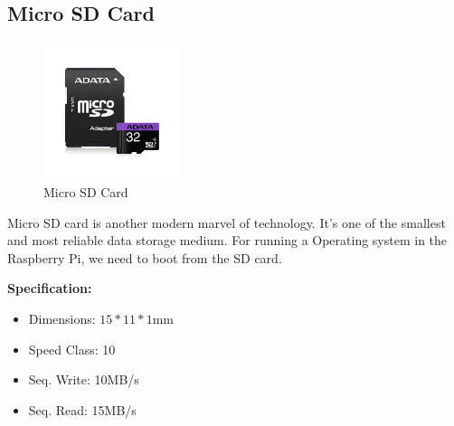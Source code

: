     \subsection{Micro SD Card}
        \begin{figure}[H]
            \centering
            \includegraphics[width=4cm]{images/sdcard.jpg}
            \caption{Micro SD Card}
        \end{figure}
        \begin{flushleft}
            Micro SD card is another modern marvel of technology. It's one of the smallest and most reliable data storage  medium. 
            For running a Operating system in the Raspberry Pi, we need to boot from the SD card.
        \end{flushleft}
        \textbf{Specification: }
        \begin{itemize}
            \item Dimensions: $15*11*1$mm
            \item Speed Class: 10
            \item Seq. Write: 10MB/s
            \item Seq. Read: 15MB/s
        \end{itemize}


